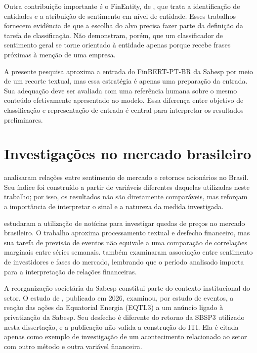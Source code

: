 Outra contribuição importante é o FinEntity, de , que trata a identificação de entidades e a atribuição de sentimento em nível de entidade. Esses trabalhos fornecem evidência de que a escolha do alvo precisa fazer parte da definição da tarefa de classificação. Não demonstram, porém, que um classificador de sentimento geral se torne orientado à entidade apenas porque recebe frases próximas à menção de uma empresa.

A presente pesquisa aproxima a entrada do FinBERT-PT-BR da Sabesp por meio de um recorte textual, mas essa estratégia é apenas uma preparação da entrada. Sua adequação deve ser avaliada com uma referência humana sobre o mesmo conteúdo efetivamente apresentado ao modelo. Essa diferença entre objetivo de classificação e representação de entrada é central para interpretar os resultados preliminares.

\section{Investigações no mercado brasileiro}

 analisaram relações entre sentimento de mercado e retornos acionários no Brasil. Seu índice foi construído a partir de variáveis diferentes daquelas utilizadas neste trabalho; por isso, os resultados não são diretamente comparáveis, mas reforçam a importância de interpretar o sinal e a natureza da medida investigada.

 estudaram a utilização de notícias para investigar quedas de preços no mercado brasileiro. O trabalho aproxima processamento textual e desfecho financeiro, mas sua tarefa de previsão de eventos não equivale a uma comparação de correlações marginais entre séries semanais.  também examinaram associação entre sentimento de investidores e fases do mercado, lembrando que o período analisado importa para a interpretação de relações financeiras.

A reorganização societária da Sabesp constitui parte do contexto institucional do setor. O estudo de , publicado em 2026, examinou, por estudo de eventos, a reação das ações da Equatorial Energia (EQTL3) a um anúncio ligado à privatização da Sabesp. Seu desfecho é diferente do retorno da SBSP3 utilizado nesta dissertação, e a publicação não valida a construção do ITI. Ela é citada apenas como exemplo de investigação de um acontecimento relacionado ao setor com outro método e outra variável financeira.


